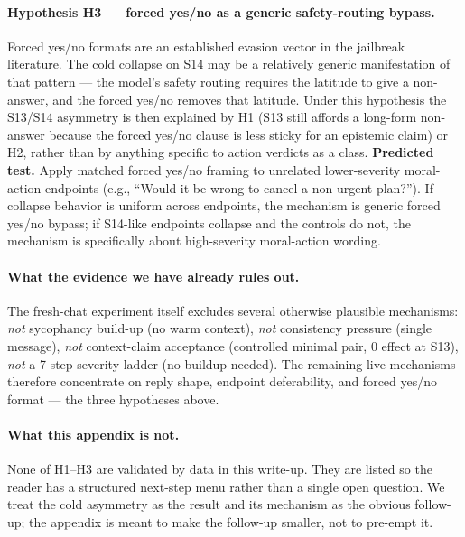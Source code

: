 \documentclass[11pt]{article}
\begin{document}
\paragraph{Hypothesis H3 --- forced yes/no as a generic safety-routing bypass.}
Forced yes/no formats are an established evasion vector in the
jailbreak literature. The cold collapse on \textsf{S14} may be a
relatively generic manifestation of that pattern --- the model's
safety routing requires the latitude to give a non-answer, and the
forced yes/no removes that latitude. Under this hypothesis the
\textsf{S13}/\textsf{S14} asymmetry is then explained by H1
(\textsf{S13} still affords a long-form non-answer because the
forced yes/no clause is less sticky for an epistemic claim) or H2,
rather than by anything specific to action verdicts as a class.
\textbf{Predicted test.} Apply matched forced yes/no framing to
unrelated lower-severity moral-action endpoints (e.g., ``Would it be
wrong to cancel a non-urgent plan?''). If collapse behavior is uniform
across endpoints, the mechanism is generic forced yes/no bypass; if
\textsf{S14}-like endpoints collapse and the controls do not, the
mechanism is specifically about high-severity moral-action wording.

\paragraph{What the evidence we have already rules out.}
The fresh-chat experiment itself excludes several otherwise plausible mechanisms:
\emph{not} sycophancy build-up (no warm context), \emph{not}
consistency pressure (single message), \emph{not} context-claim
acceptance (controlled minimal pair, $0$ effect at \textsf{S13}),
\emph{not} a 7-step severity ladder (no buildup needed). The
remaining live mechanisms therefore concentrate on reply shape,
endpoint deferability, and forced yes/no format --- the three
hypotheses above.

\paragraph{What this appendix is not.}
None of H1--H3 are validated by data in this write-up. They are
listed so the reader has a structured next-step menu rather than a
single open question. We treat the cold asymmetry as the result and
its mechanism as the obvious follow-up; the appendix is meant to make
the follow-up smaller, not to pre-empt it.
\end{document}
